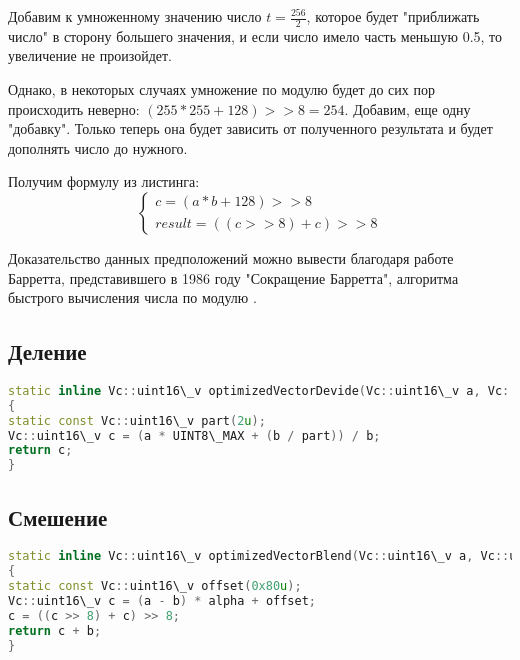 Добавим к умноженному значению число $t = \frac{256}{2}$, которое будет "приближать число" в сторону большего значения, и если число имело часть меньшую 0.5, то увеличение не произойдет.

Однако, в некоторых случаях умножение по модулю будет до сих пор происходить неверно: $(255*255+128) >> 8 = 254$. Добавим, еще одну "добавку". Только теперь она будет зависить от полученного результата и будет дополнять число до нужного.

Получим формулу из листинга: 
\begin{equation}
\begin{cases} 
c = (a * b + 128) >> 8 \\
result = ((c >> 8) + c) >> 8
\end{cases}
\end{equation}

Доказательство данных  предположений можно вывести благодаря работе Барретта, представившего в 1986 году  "Сокращение Барретта", алгоритма быстрого вычисления числа по модулю \cite{bib7}.


\subsection{Деление}
\begin{lstlisting}[language=c++]
static inline Vc::uint16\_v optimizedVectorDevide(Vc::uint16\_v a, Vc::uint16\_v b)
{
static const Vc::uint16\_v part(2u);
Vc::uint16\_v c = (a * UINT8\_MAX + (b / part)) / b;
return c;
}
\end{lstlisting}

\subsection{Смешение}
\begin{lstlisting}[language=c++]
static inline Vc::uint16\_v optimizedVectorBlend(Vc::uint16\_v a, Vc::uint16\_v b, Vc::uint16\_v alpha)
{
static const Vc::uint16\_v offset(0x80u);
Vc::uint16\_v c = (a - b) * alpha + offset;
c = ((c >> 8) + c) >> 8;
return c + b;
}

\end{lstlisting}


